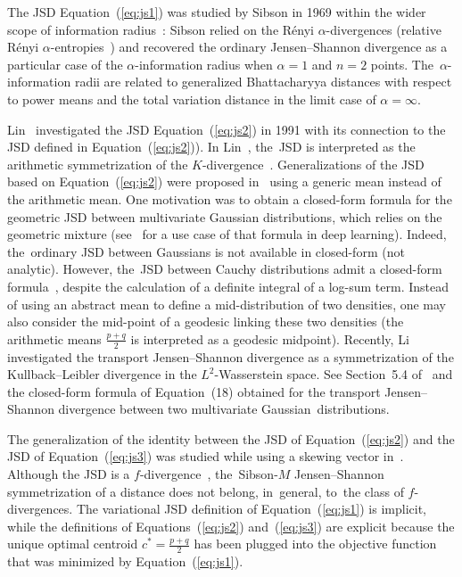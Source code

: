 \documentclass[entropy,article,accept,oneauthor,pdftex,entropy]{Definitions/mdpi}
\begin{document}
\begin{paracol}{2}
The JSD Equation~(\ref{eq:js1}) was studied by Sibson in 1969 within the wider scope of information radius~\cite{Sibson-1969}:
Sibson relied on the R\'enyi $\alpha$-divergences (relative R\'enyi $\alpha$-entropies~\cite{Entropy-1995})
 and recovered the ordinary Jensen--Shannon divergence as a particular case of the $\alpha$-information radius when $\alpha=1$ and $n=2$ points. The~$\alpha$-information radii are related to generalized Bhattacharyya distances with respect to power means and the total variation distance in the limit case of $\alpha=\infty$.



Lin~\cite{JS-1991} investigated the JSD Equation~(\ref{eq:js2}) in 1991 with its connection to the JSD defined in Equation~(\ref{eq:js2})).
In Lin~\cite{JS-1991}, the~JSD is interpreted as the arithmetic symmetrization of the $K$-divergence~\cite{nielsen2010family}.
Generalizations of the JSD based on Equation~(\ref{eq:js2}) were proposed in~\cite{JSsym-2019} using a generic mean instead of the arithmetic mean.
One motivation was to obtain a closed-form formula for the geometric JSD between multivariate Gaussian distributions, which relies on the geometric mixture (see~\cite{VIGJSD-2020} for a use case of that formula in deep learning).
Indeed, the~ordinary JSD between Gaussians is not available in closed-form (not analytic).
However, the~JSD between Cauchy distributions admit a closed-form formula~\cite{CauchyJSD-2021}, despite the calculation of a definite integral of a log-sum term. Instead of using an abstract mean to define a mid-distribution of two densities, one may also consider the mid-point of a geodesic linking these two densities (the arithmetic means $\frac{p+q}{2}$ is interpreted as a geodesic midpoint). 
Recently, Li~\cite{TransportInfoBD-2021} investigated the transport Jensen--Shannon divergence as a symmetrization of the Kullback--Leibler divergence in the $L^2$-Wasserstein space. 
See Section~5.4 of~\cite{TransportInfoBD-2021} and the closed-form formula of Equation~(18) obtained for the transport Jensen--Shannon divergence between two multivariate Gaussian~distributions.

The generalization of the identity between the JSD of Equation~(\ref{eq:js2}) and the JSD of Equation~(\ref{eq:js3}) was studied while using a skewing vector in~\cite{JScentroid-2020}. 
Although the JSD is a $f$-divergence~\cite{Csiszar-1964,JScentroid-2020}, the~Sibson-$M$ Jensen--Shannon symmetrization of a distance does not belong, in~general, to~the class of $f$-divergences.
The variational JSD definition of \mbox{Equation~(\ref{eq:js1})} is implicit, while the definitions of Equations~(\ref{eq:js2}) and~(\ref{eq:js3}) are explicit because the unique optimal centroid $c^*=\frac{p+q}{2}$ has been plugged into the objective function that was minimized by Equation~(\ref{eq:js1}).



\end{paracol}
\end{document}
